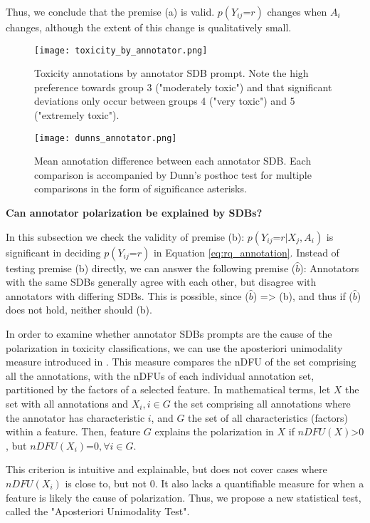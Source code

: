 Thus, we conclude that the premise (a) is valid. $p(Y_{ij} \text{=} r)$ changes when $A_i$ changes, although the extent of this change is qualitatively small.

\begin{figure}
	\centering
	\texttt{[image: toxicity\_by\_annotator.png]}
	\caption{Toxicity annotations by annotator \ac{SDB} prompt. Note the high preference towards group 3 ("moderately toxic") and that significant deviations only occur between groups 4 ("very toxic") and 5 ("extremely toxic").}
	\label{fig::toxicity-annotator}
\end{figure}

\begin{figure}
	\centering
	\texttt{[image: dunns\_annotator.png]}
	\caption{Mean annotation difference between each annotator \ac{SDB}. Each comparison is accompanied by Dunn's posthoc test for multiple comparisons in the form of significance asterisks.}
	\label{fig::toxicity-annotator-significance}
\end{figure}

\textbf{Can annotator polarization be explained by SDBs?}

In this subsection we check the validity of premise (b): $p(Y_{ij} \text{=} r | X_j, A_i)$ is significant in deciding $p(Y_{ij} \text{=} r)$ in Equation \ref{eq:rq_annotation}. Instead of testing premise (b) directly, we can answer the following premise ($\hat{b}$): Annotators with the same \acp{SDB} generally agree with each other, but disagree with annotators with differing \acp{SDB}. This is possible, since ($\hat{b}$) => (b), and thus if ($\hat{b}$) does not hold, neither should (b).

In order to examine whether annotator \acp{SDB} prompts are the cause of the polarization in toxicity classifications, we can use the aposteriori unimodality measure introduced in \citet{pavlopoulos-likas-2024-polarized}. This measure compares the \ac{nDFU} of the set comprising all the annotations, with the \acp{nDFU} of each individual annotation set, partitioned by the factors of a selected feature. In mathematical terms, let $X$ the set with all annotations and $X_i, i \in G$ the set comprising all annotations where the annotator has characteristic $i$, and $G$ the set of all characteristics (factors) within a feature. Then, feature $G$ explains the polarization in $X$ if $nDFU(X) \text{>} 0$, but $nDFU(X_i) \text{=} 0, \forall i \in G$. 

This criterion is intuitive and explainable, but does not cover cases where $nDFU(X_i)$ is close to, but not $0$. It also lacks a quantifiable measure for when a feature is likely the cause of polarization. Thus, we propose a new statistical test, called the "Aposteriori Unimodality Test". 

